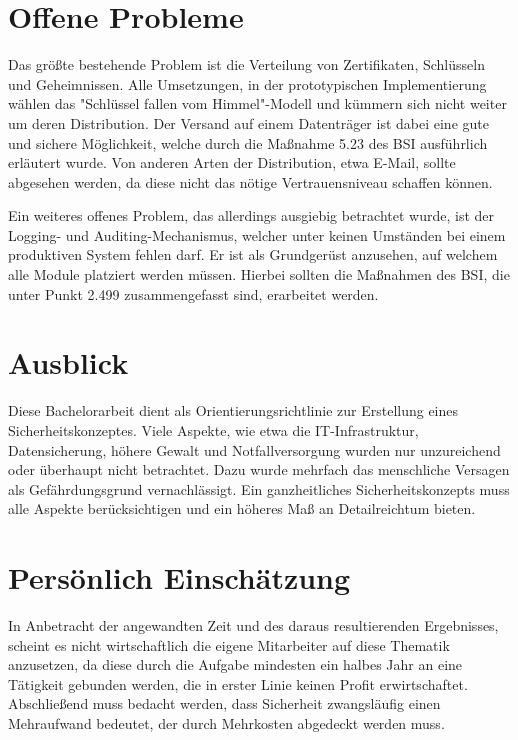 \documentclass[11pt,a4paper]{report}
\begin{document}
\section{Offene Probleme}

Das größte bestehende Problem ist die Verteilung von Zertifikaten, Schlüsseln und Geheimnissen. Alle Umsetzungen, in der prototypischen Implementierung wählen das "Schlüssel fallen vom Himmel"-Modell und kümmern sich nicht weiter um deren Distribution. Der Versand auf einem Datenträger ist dabei eine gute und sichere Möglichkeit, welche durch die Maßnahme 5.23 des BSI ausführlich erläutert wurde. Von anderen Arten der Distribution, etwa E-Mail, sollte abgesehen werden, da diese nicht das nötige Vertrauensniveau schaffen können.

Ein weiteres offenes Problem, das allerdings ausgiebig betrachtet wurde, ist der Logging- und Auditing-Mechanismus, welcher unter keinen Umständen bei einem produktiven System fehlen darf. Er ist als Grundgerüst anzusehen, auf welchem alle Module platziert werden müssen. Hierbei sollten die Maßnahmen des BSI, die unter Punkt 2.499 \cite{bsi_m2499} zusammengefasst sind, erarbeitet werden.

\section{Ausblick}

Diese Bachelorarbeit dient als Orientierungsrichtlinie zur Erstellung eines Sicherheitskonzeptes. Viele Aspekte, wie etwa die IT-Infrastruktur, Datensicherung, höhere Gewalt und Notfallversorgung wurden nur unzureichend oder überhaupt nicht betrachtet. Dazu wurde mehrfach das menschliche Versagen als Gefährdungsgrund vernachlässigt. Ein ganzheitliches Sicherheitskonzepts muss alle Aspekte berücksichtigen und ein höheres Maß an Detailreichtum bieten.

\section{Persönlich Einschätzung}

In Anbetracht der angewandten Zeit und des daraus resultierenden Ergebnisses, scheint es nicht wirtschaftlich die eigene Mitarbeiter auf diese Thematik anzusetzen, da diese durch die Aufgabe mindesten ein halbes Jahr an eine Tätigkeit gebunden werden, die in erster Linie keinen Profit erwirtschaftet. Abschließend muss bedacht werden, dass Sicherheit zwangsläufig einen Mehraufwand bedeutet, der durch Mehrkosten abgedeckt werden muss.
\end{document}
